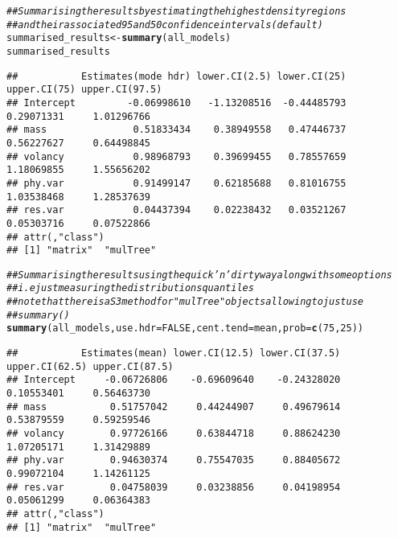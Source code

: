\documentclass{article}\usepackage[]{graphicx}\usepackage[]{color}
\makeatletter
\newcommand{\hlnum}[1]{\textcolor[rgb]{0.686,0.059,0.569}{#1}}%
\newcommand{\hlcom}[1]{\textcolor[rgb]{0.678,0.584,0.686}{\textit{#1}}}%
\newcommand{\hlstd}[1]{\textcolor[rgb]{0.345,0.345,0.345}{#1}}%
\newcommand{\hlkwb}[1]{\textcolor[rgb]{0.69,0.353,0.396}{#1}}%
\newcommand{\hlkwc}[1]{\textcolor[rgb]{0.333,0.667,0.333}{#1}}%
\newcommand{\hlkwd}[1]{\textcolor[rgb]{0.737,0.353,0.396}{\textbf{#1}}}%
\newenvironment{kframe}{%
 \def\at@end@of@kframe{}%
 \ifinner\ifhmode%
  \def\at@end@of@kframe{\end{minipage}}%
  \begin{minipage}{\columnwidth}%
 \fi\fi%
 \def\FrameCommand##1{\hskip\@totalleftmargin \hskip-\fboxsep
 \colorbox{shadecolor}{##1}\hskip-\fboxsep
     \hskip-\linewidth \hskip-\@totalleftmargin \hskip\columnwidth}%
 \MakeFramed {\advance\hsize-\width
   \@totalleftmargin\z@ \linewidth\hsize
   \@setminipage}}%
 {\par\unskip\endMakeFramed%
 \at@end@of@kframe}
\newenvironment{knitrout}{}{} %
\makeatother
\begin{document}
\begin{knitrout}
\color{fgcolor}\begin{kframe}
\begin{alltt}
\hlcom{## Summarising the results by estimating the highest density regions}
\hlcom{## and their associated 95 and 50 confidence intervals (default)}
\hlstd{summarised_results} \hlkwb{<-} \hlkwd{summary}\hlstd{(all_models)}
\hlstd{summarised_results}
\end{alltt}
\begin{verbatim}
##           Estimates(mode hdr) lower.CI(2.5) lower.CI(25) upper.CI(75) upper.CI(97.5)
## Intercept         -0.06998610   -1.13208516  -0.44485793   0.29071331     1.01296766
## mass               0.51833434    0.38949558   0.47446737   0.56227627     0.64498845
## volancy            0.98968793    0.39699455   0.78557659   1.18069855     1.55656202
## phy.var            0.91499147    0.62185688   0.81016755   1.03538468     1.28537639
## res.var            0.04437394    0.02238432   0.03521267   0.05303716     0.07522866
## attr(,"class")
## [1] "matrix"  "mulTree"
\end{verbatim}
\begin{alltt}
\hlcom{## Summarising the results using the quick 'n' dirty way along with some options}
\hlcom{## i.e just measuring the distributions quantiles}
\hlcom{## note that there is a S3 method for "mulTree" objects allowing to just use}
\hlcom{## summary()}
\hlkwd{summary}\hlstd{(all_models,} \hlkwc{use.hdr} \hlstd{=} \hlnum{FALSE}\hlstd{,} \hlkwc{cent.tend} \hlstd{= mean,} \hlkwc{prob} \hlstd{=} \hlkwd{c}\hlstd{(}\hlnum{75}\hlstd{,} \hlnum{25}\hlstd{))}
\end{alltt}
\begin{verbatim}
##           Estimates(mean) lower.CI(12.5) lower.CI(37.5) upper.CI(62.5) upper.CI(87.5)
## Intercept     -0.06726806    -0.69609640    -0.24328020     0.10553401     0.56463730
## mass           0.51757042     0.44244907     0.49679614     0.53879559     0.59259546
## volancy        0.97726166     0.63844718     0.88624230     1.07205171     1.31429889
## phy.var        0.94630374     0.75547035     0.88405672     0.99072104     1.14261125
## res.var        0.04758039     0.03238856     0.04198954     0.05061299     0.06364383
## attr(,"class")
## [1] "matrix"  "mulTree"
\end{verbatim}
\end{kframe}
\end{knitrout}
\end{document}

